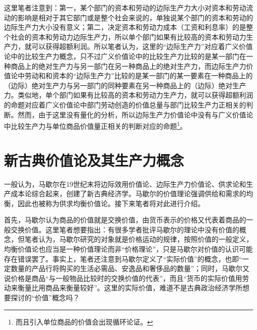 这里笔者注意到：第一，某个部门的资本和劳动的边际生产力大小对资本和劳动流动的影响是相对于其它部门或是整个社会来说的，单独说某个部门的资本和劳动的边际生产力大小没有意义；第二，决定资本和劳动力成本（工资和利息率）的是整个社会的资本和劳动力边际生产力，所以单个部门如果有比较高的资本和劳动力生产力，就可以获得超额利润\cite[255]{KeLaKeCaiFuDeFenPei1983}。所以笔者认为，这里的“边际生产力”对应着广义价值论中的比较生产力概念，只不过广义价值论中的比较生产力比较的是某一部门在一种商品上的绝对生产力与另一部门在另一种商品上的绝对生产力，而边际生产力价值论中劳动和和资本的“边际生产力”比较的是某一部门的某一要素在一种商品上的（边际）绝对生产力与另一部门的同种要素在另一种商品上的（边际）绝对生产力。类似地，单个部门如果有比较高的资本和劳动力生产力，就可以获得超额利润的命题对应着广义价值论中部门劳动创造的价值总量与部门比较生产力正相关的判断。然而，由于这里没有量化的分析，所以边际生产力价值论中没有与广义价值论中比较生产力与单位商品价值量正相关的判断对应的命题\footnote{而且引入单位商品的价值会出现循环论证。}。

\section{新古典价值论及其生产力概念}

一般认为，马歇尔在19世纪末将边际效用价值论、边际生产力价值论、供求论和生产成本论综合起来，创建了新古典经济学\cite[295]{YanZhiJieXiFangJingJiXueShuoShiJiaoChengDiErBan2013}\cite[340]{YanZhiJieCongBianJiGeMingDaoKaiEnSiGeMing2022}\cite[i]{MaXieErJingJiXueYuanLi2019}\cite[183-184]{CaiJiMingCongGuDianZhengZhiJingJiXueDaoZhongGuoTeSeSheHuiZhuYiZhengZhiJingJiXueJiYuZhongGuoShiJiaoDeZhengZhiJingJiXueYanBianShangCe2023}。马歇尔的价值理论强调供给和需求的均衡，因此也被称为供求均衡价值论\cite[390]{YanZhiJieCongBianJiGeMingDaoKaiEnSiGeMing2022}。接下来笔者将对此进行介绍。

首先，马歇尔认为商品的价值就是交换价值，由货币表示的价格又代表着商品的一般交换价值\cite[86-87]{MaXieErJingJiXueYuanLi2019}。这里笔者想要指出：有很多学者批评马歇尔的理论中没有价值的概念\cite[299]{YanZhiJieXiFangJingJiXueShuoShiJiaoChengDiErBan2013}\cite[v]{MaXieErJingJiXueYuanLi2019}，但笔者认为，马歇尔研究的对象就是价格运动的规律，按照价值的一般定义，均衡价值论也应当是一种价值理论而非“价格理论”，只是马歇尔对价值的认识可能存在错误罢了。事实上，笔者还注意到马歇尔定义了“实际价值”的概念，也即“一定数量的产品行将购买的生活必需品、安逸品和奢侈品的数量”\cite[720]{MaXieErJingJiXueYuanLi2019}；同时，马歇尔又说价格是商品“与一般物品比较时的交换价值的代表”\cite[87]{MaXieErJingJiXueYuanLi2019}，而且“货币的实际价值用劳动来衡量比用商品来衡量较好”\cite[87]{MaXieErJingJiXueYuanLi2019}。这里的实际价值，难道不是古典政治经济学所想要探讨的“价值”概念吗？


